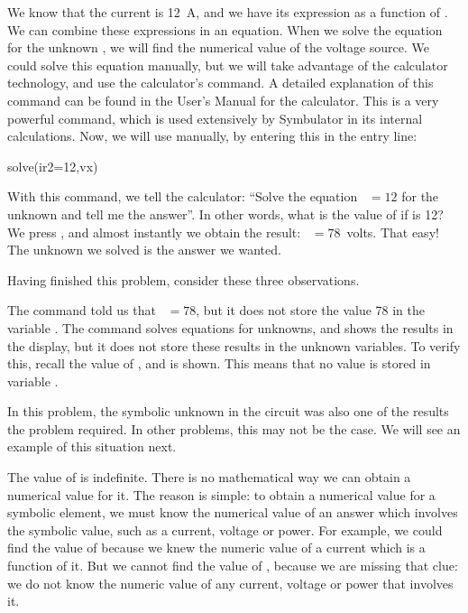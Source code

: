 We know that the current is 12~A, and we have its expression as a
function of . We can combine these expressions in an
equation. When we solve the equation for the unknown , we
will find the numerical value of the voltage source. We could solve
this equation manually, but we will take advantage of the calculator
technology, and use the calculator's  command. A
detailed explanation of this command can be found in the User's
Manual for the calculator. This is a very powerful command, which is
used extensively by Symbulator in its internal calculations. Now, we
will use  manually, by entering this in the entry line:

\begin{entry}
solve(ir2=12,vx)
\end{entry}

With this command, we tell the calculator: ``Solve the equation
~$= 12$ for the unknown  and tell me the
answer''. In other words, what is the value of  if
 is 12? We press , and almost instantly we
obtain the result: ~$= 78$~volts. That easy! The unknown we
solved is the answer we wanted.

Having finished this problem, consider these three observations.

The  command told us that ~$= 78$, but it does
not store the value 78 in the variable . The 
command solves equations for unknowns, and shows the results in the
display, but it does not store these results in the unknown
variables. To verify this, recall the value of , and
 is shown. This means that no value is stored in variable
.

In this problem, the symbolic unknown in the circuit was also one of
the results the problem required. In other problems, this may not be
the case. We will see an example of this situation next.

The value of  is indefinite. There is no mathematical way
we can obtain a numerical value for it. The reason is simple: to
obtain a numerical value for a symbolic element, we must know the
numerical value of an answer which involves the symbolic value, such
as a current, voltage or power. For example, we could find the value
of  because we knew the numeric value of a current which is
a function of it. But we cannot find the value of , because
we are missing that clue: we do not know the numeric value of any
current, voltage or power that involves it.

